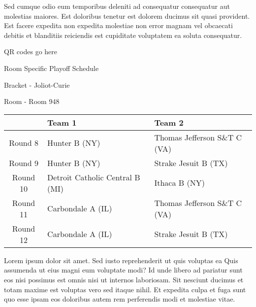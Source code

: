 \documentclass{article}%
\begin{document}
\newline%
Sed cumque odio eum temporibus deleniti ad consequatur consequatur aut molestias maiores. Est doloribus tenetur est dolorem ducimus sit quasi provident. Est facere expedita non expedita molestiae non error magnam vel obcaecati debitis et blanditiis reiciendis est cupiditate voluptatem ea soluta consequatur.%
\vspace*{140pt}%
\begin{center}%
\begin{Huge}%
QR codes go here%
\end{Huge}%
\end{center}%
\newpage%
\begin{center}%
\begin{Huge}%
Room Specific Playoff Schedule%
\end{Huge}%
\vspace*{8pt}%
\linebreak%
\begin{Large}%
Bracket {-} Joliot{-}Curie%
\end{Large}%
\vspace*{8pt}%
\linebreak%
\vspace*{8pt}%
\begin{Large}%
Room {-} Room 948%
\end{Large}%
\end{center}%
%
\begin{tabularx}{\textwidth}{|c|Y|Y|}%
\hline%
&Team 1&Team 2\\%
\hline%
Round 8&Hunter B (NY)&Thomas Jefferson S\&T C (VA)\\%
Round 9&Hunter B (NY)&Strake Jesuit B (TX)\\%
Round 10&Detroit Catholic Central B (MI)&Ithaca B (NY)\\%
Round 11&Carbondale A (IL)&Thomas Jefferson S\&T C (VA)\\%
Round 12&Carbondale A (IL)&Strake Jesuit B (TX)\\%
\hline%
\end{tabularx}%
\vspace*{8pt}%
\newline%
Lorem ipsum dolor sit amet. Sed iusto reprehenderit ut quis voluptas ea Quis assumenda ut eius magni eum voluptate modi? Id unde libero ad pariatur sunt eos nisi possimus est omnis nisi ut internos laboriosam. Sit nesciunt ducimus et totam maxime est voluptas vero sed itaque nihil. Et expedita culpa et fuga sunt quo esse ipsam eos doloribus autem rem perferendis modi et molestiae vitae.\newline%
\end{document}
